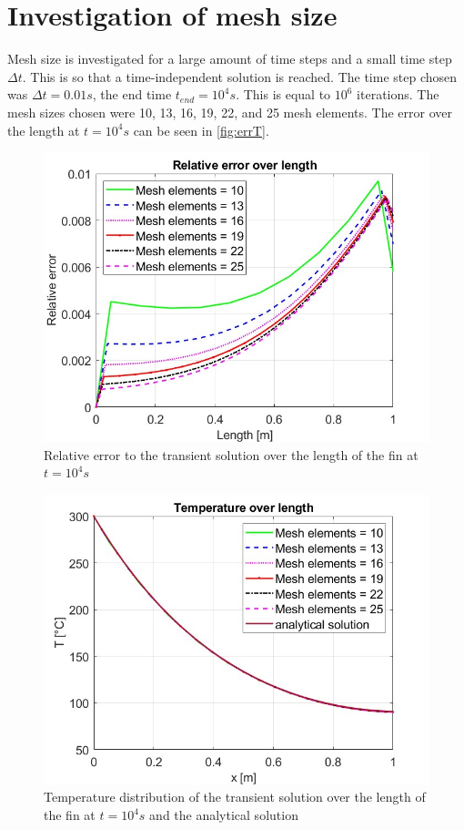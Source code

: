 \chapter{Investigation of mesh size}


Mesh size is investigated for a large amount of time steps and a small time step $\Delta t$. This is so that a time-independent solution is reached. The time step chosen was $\Delta t = 0.01 s$, the end time $t_{end} = 10^4 s$. This is equal to $10^6$ iterations. The mesh sizes chosen were 10, 13, 16, 19, 22, and 25 mesh elements. The error over the length at $t = 10^4 s$ can be seen in \autoref{fig:errT}.


\begin{figure}[H]
    \centering
    \includegraphics[width=.75\textwidth]{figures/TsmalldtBigtErr.jpg}
    \caption{Relative error to the transient solution over the length of the fin at $t = 10^4 s$}
    \label{fig:errT}
\end{figure}




\begin{figure}[H]
    \centering
    \includegraphics[width=.75\textwidth]{figures/TsmalldtBigt.jpg}
    \caption{Temperature distribution of the transient solution over the length of the fin at $t = 10^4 s$ and the analytical solution}
    \label{fig:T}
\end{figure}

